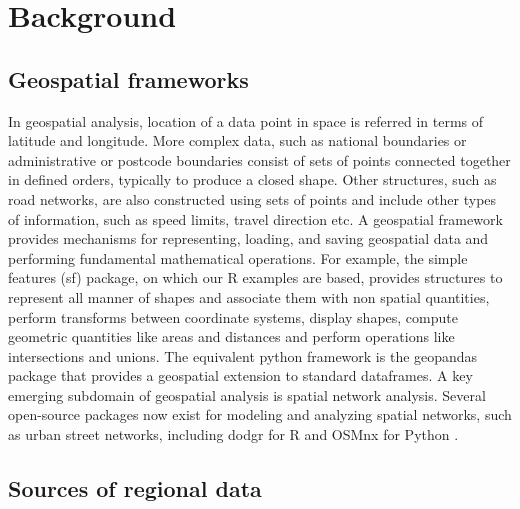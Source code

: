 \documentclass[utf8]{frontiersHLTH}
\begin{document}
\section{Background}\label{background}

\subsection{Geospatial frameworks}\label{geospatial-frameworks}

In geospatial analysis, location of a data point in space is referred
in terms of latitude and longitude. More complex data, such as
national boundaries or administrative or postcode boundaries consist
of sets of points connected together in defined orders, typically to
produce a closed shape. Other structures, such as road networks, are
also constructed using sets of points and include other types of
information, such as speed limits, travel direction etc. A geospatial
framework provides mechanisms for representing, loading, and saving
geospatial data and performing fundamental mathematical
operations. For example, the simple features (sf) \cite{Pebesma_2018}
package, on which our R examples are based, provides structures to
represent all manner of shapes and associate them with non spatial
quantities, perform transforms between coordinate systems, display
shapes, compute geometric quantities like areas and distances and
perform operations like intersections and unions. The equivalent
python framework is the geopandas package that provides a geospatial
extension to standard dataframes. A key emerging subdomain of 
geospatial analysis is spatial network analysis. Several open-source 
packages now exist for modeling and analyzing spatial networks, 
such as urban street networks, including dodgr for R \cite{Padgham_2019}
and OSMnx for Python \cite{boeing_osmnx_2017}.

\subsection{Sources of regional data}\label{sources-of-regional-data}
\end{document}
